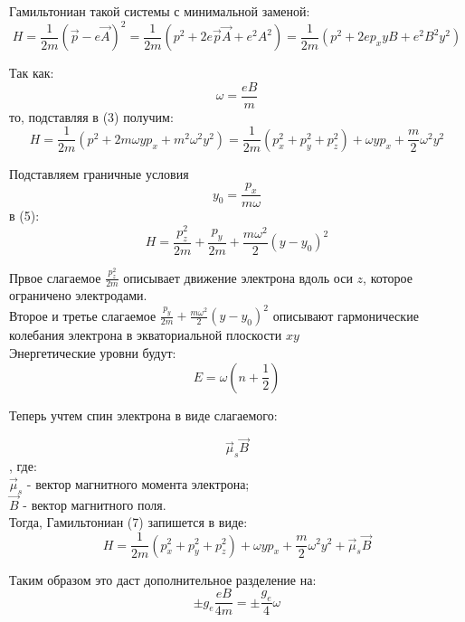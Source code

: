 \documentclass[11pt]{article}
\begin{document}
Гамильтониан такой системы с минимальной заменой:
\begin{equation}
H=\frac{1}{2m}(\vec p-e\vec A)^2 = 
\frac{1}{2m}(p^2 + 2e\vec p \vec A + e^2 A^2) =
 \frac{1}{2m}(p^2+2ep_xyB+e^2B^2y^2)
\end{equation}

Так как:
\begin{equation}
\omega = \frac{eB}{m}
\end{equation}
то, подставляя в (3) получим:
\begin{equation}
H=\frac{1}{2m}(p^2+2m\omega yp_x+m^2\omega^2 y^2)=\frac{1}{2m}(p_x^2+p_y^2+p_z^2) + \omega yp_x + \frac{m}{2}\omega^2 y^2
\end{equation}

Подставляем граничные условия
\begin{equation}
y_0 = \frac{p_x}{m\omega}
\end{equation}
в (5):
\begin{equation}
H = \frac{p_z^2}{2m} + \frac{p_y}{2m} + \frac{m\omega^2}{2}(y-y_0)^2
\end{equation}

Првое слагаемое $\frac{p_z^2}{2m}$ описывает движение электрона вдоль оси $z$, которое ограничено электродами. \\

Второе и третье слагаемое $\frac{p_y}{2m} + \frac{m\omega^2}{2}(y-y_0)^2$ описывают гармонические колебания электрона в экваториальной плоскости $xy$ \\

Энергетические уровни будут:
\begin{equation}
E = \omega(n+\frac{1}{2})
\end{equation}

Теперь учтем спин электрона в виде слагаемого:

\begin{equation}
\vec\mu_s\vec B
\end{equation}
, где: \\
$\vec\mu_s$ - вектор магнитного момента электрона; \\
$\vec B$ - вектор магнитного поля. \\

Тогда, Гамильтониан (7) запишется в виде:
\begin{equation}
H=\frac{1}{2m}(p_x^2+p_y^2+p_z^2) + \omega yp_x + \frac{m}{2}\omega^2 y^2 +\vec\mu_s\vec B
\end{equation}

Таким образом это даст дополнительное разделение на: 
\begin{equation}
 \pm g_e \frac{eB}{4m} = \pm \frac{g_e}{4}\omega
\end{equation}
\end{document}
